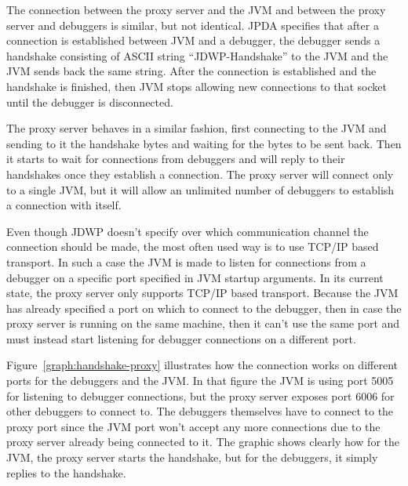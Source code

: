 \documentclass[..thesis.tex]{subfiles}
\begin{document}
The connection between the proxy server and the JVM and between the proxy server and debuggers is similar, but not identical.
JPDA specifies that after a connection is established between JVM and a debugger, the debugger sends a handshake consisting of ASCII string \enquote{JDWP-Handshake} to the JVM and the JVM sends back the same string.
After the connection is established and the handshake is finished, then JVM stops allowing new connections to that socket until the debugger is disconnected.

The proxy server behaves in a similar fashion, first connecting to the JVM and sending to it the handshake bytes and waiting for the bytes to be sent back.
Then it starts to wait for connections from debuggers and will reply to their handshakes once they establish a connection.
The proxy server will connect only to a single JVM, but it will allow an unlimited number of debuggers to establish a connection with itself.

Even though JDWP doesn't specify over which communication channel the connection should be made, the most often used way is to use TCP/IP based transport.
In such a case the JVM is made to listen for connections from a debugger on a specific port specified in JVM startup arguments.
In its current state, the proxy server only supports TCP/IP based transport.
Because the JVM has already specified a port on which to connect to the debugger, then in case the proxy server is running on the same machine, then it can't use the same port and must instead start listening for debugger connections on a different port.



Figure~\ref{graph:handshake-proxy} illustrates how the connection works on different ports for the debuggers and the JVM.
In that figure the JVM is using port 5005 for listening to debugger connections, but the proxy server exposes port 6006 for other debuggers to connect to.
The debuggers themselves have to connect to the proxy port since the JVM port won't accept any more connections due to the proxy server already being connected to it.
The graphic shows clearly how for the JVM, the proxy server starts the handshake, but for the debuggers, it simply replies to the handshake.
\end{document}
